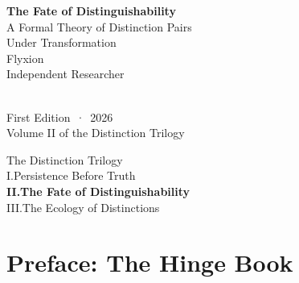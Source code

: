 \documentclass[12pt,twoside,openright]{book}
\newcommand{\distPairs}{X\times X}
\newcommand{\fateMap}{\mathfrak{F}}
\newcommand{\fateSpace}{\mathcal{S}}
\begin{document}
\frontmatter

\begin{titlepage}
\centering\vspace*{2.5cm}
{\sffamily\Huge\bfseries\color{DistBlue}
  The Fate of Distinguishability}\\[0.9em]
{\sffamily\Large\color{DistGray}
  A Formal Theory of Distinction Pairs\\
  Under Transformation}\\[2.2cm]
{\large Flyxion}\\[0.4em]
{\sffamily\color{DistGray}Independent Researcher}\\[2.5cm]
\\[2cm]
{\sffamily\color{DistGray}First Edition~·~2026}\\[0.5em]
{\sffamily\small\color{DistGray}
  Volume II of the Distinction Trilogy}
\end{titlepage}

\cleardoublepage
\vspace*{5cm}
\begin{center}
{\sffamily\large\color{DistGray}The Distinction Trilogy}\\[1em]
{\sffamily\normalsize\color{DistBlue}
  I.\quad Persistence Before Truth}\\[0.3em]
{\sffamily\normalsize\bfseries\color{FateViolet}
  II.\quad The Fate of Distinguishability}\\[0.3em]
{\sffamily\normalsize\color{DistBlue}
  III.\quad The Ecology of Distinctions}
\end{center}
\cleardoublepage

\tableofcontents

\chapter*{Preface: The Hinge Book}
\end{document}

